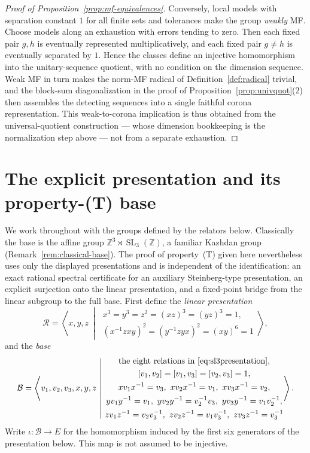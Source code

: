 \documentclass[11pt]{amsart}
\theoremstyle{definition}
\theoremstyle{remark}
\theoremstyle{plain}
\newcommand{\SL}{\operatorname{SL}}
\begin{document}
\begin{proof}[Proof of Proposition~\ref{prop:mf-equivalences}]
Conversely, local models with separation constant $1$ for all finite
sets and tolerances make the group \emph{weakly} MF\@.  Choose models
along an exhaustion with errors tending to zero.  Then each fixed pair
$g,h$ is eventually represented multiplicatively, and each fixed pair
$g\ne h$ is eventually separated by $1$.  Hence the classes define an
injective homomorphism into the unitary-sequence quotient, with no
condition on the dimension sequence.  Weak MF in turn makes the norm-MF radical of
Definition~\ref{def:radical} trivial, and the block-sum diagonalization
in the proof of Proposition~\ref{prop:univquot}(2) then assembles the
detecting sequences into a single faithful corona representation.  This
weak-to-corona implication is thus obtained from the
universal-quotient construction --- whose dimension bookkeeping is the
normalization step above --- not from a separate exhaustion.

\end{proof}
\section{The explicit presentation and its property-(T) base}\label{sec:group}

We work throughout with the groups defined by the relators below.
Classically the base is the affine group
$\mathbb Z^3\rtimes\SL_3(\mathbb Z)$, a familiar Kazhdan group
(Remark~\ref{rem:classical-base}).  The proof of
property~\textup{(T)} given here nevertheless uses only the
displayed presentations and is independent of the identification: an
exact rational spectral certificate for an auxiliary Steinberg-type
presentation, an explicit surjection onto the linear presentation, and
a fixed-point bridge from the linear subgroup to the full base.
First define the \emph{linear presentation}
\begin{equation}\label{eq:sl3presentation}
 \mathcal R=\left\langle x,y,z\ \middle|\
 \begin{gathered}
 x^3=y^3=z^2=(xz)^3=(yz)^3=1,\\
 (x^{-1}zxy)^2=(y^{-1}zyx)^2=(xy)^6=1
 \end{gathered}\right\rangle,
\end{equation}
and the \emph{base}
\begin{equation}\label{eq:gamma-presentation}
\mathcal B=\left\langle v_1,v_2,v_3,x,y,z\ \middle|\
\begin{gathered}
\text{the eight relations in \eqref{eq:sl3presentation}},\\
[v_1,v_2]=[v_1,v_3]=[v_2,v_3]=1,\\
xv_1x^{-1}=v_3,\ xv_2x^{-1}=v_1,\
xv_3x^{-1}=v_2,\\
yv_1y^{-1}=v_1,\ yv_2y^{-1}=v_2^{-1}v_3,\
yv_3y^{-1}=v_1v_2^{-1},\\
zv_1z^{-1}=v_2v_3^{-1},\ zv_2z^{-1}=v_1v_3^{-1},\
zv_3z^{-1}=v_3^{-1}
\end{gathered}\right\rangle.
\end{equation}
Write $\iota\colon\mathcal B\to E$ for the homomorphism induced by the first
six generators of the presentation below.  This map is not assumed to be
injective.
\end{document}
